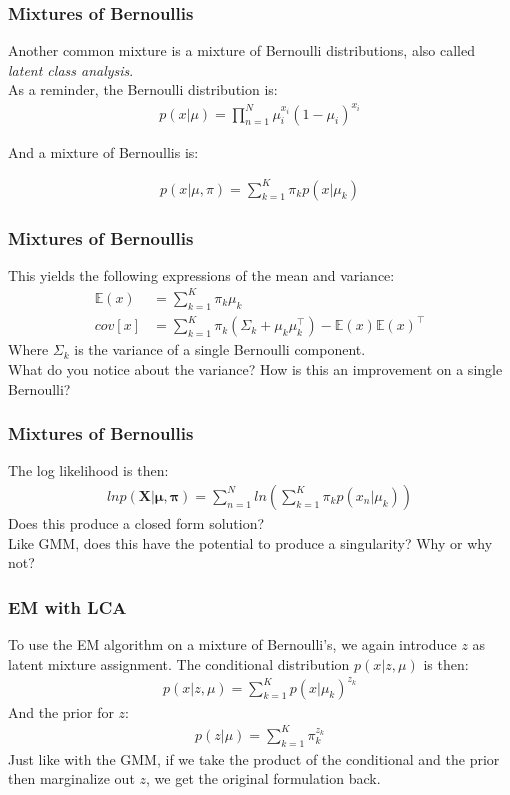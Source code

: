 \documentclass{beamer}
\begin{document}
\begin{frame}
\frametitle{Mixtures of Bernoullis}
	Another common mixture is a mixture of Bernoulli distributions, also called \textit{latent class analysis}.\\
	As a reminder, the Bernoulli distribution is:
	\begin{align*}
	p(x|\mu) = \prod_{n = 1}^{N} \mu_i^{x_i}(1 - \mu_i)^{x_i}
	\end{align*}
	
	And a mixture of Bernoullis is:
	
	\begin{align*}
		p(x|\mu, \pi) = \sum_{k=1}^{K} \pi_k p(x|\mu_k) 
	\end{align*}
\end{frame}


\begin{frame}
\frametitle{Mixtures of Bernoullis}
	This yields the following expressions of the mean and variance:
	\begin{align*}
	\mathbb{E}(x)& = \sum_{k=1}^{K} \pi_k \mu_k \\
	cov[x]  &= \sum_{k=1}^{K}  \pi_k (\Sigma_k + \mu_k \mu_k^{\intercal}) - \mathbb{E}(x)\mathbb{E}(x)^{\intercal}
	\end{align*}
	Where $\Sigma_{k}$ is the variance of a single Bernoulli component.\\
	What do you notice about the variance? How is this an improvement on a single Bernoulli?
\end{frame}

\begin{frame}
\frametitle{Mixtures of Bernoullis}
	The log likelihood is then:
	\begin{align*}
	ln p(\mathbf{X}|\mathbf{\mu}, \mathbf{\pi}) = \sum_{n=1}^{N} ln (\sum_{k =1}^{K} \pi_k p(x_n|\mu_k))
	\end{align*}
	Does this produce a closed form solution?\\
	Like GMM, does this have the potential to produce a singularity? Why or why not?
\end{frame}

\begin{frame}
\frametitle{EM with LCA}
	To use the EM algorithm on a mixture of Bernoulli's, we again introduce $z$ as latent mixture assignment. The conditional distribution $p(x|z, \mu)$ is then:
	\begin{align*}
	p(x|z, \mu) = \sum_{k=1}^{K} p(x|\mu_k)^{z_k}
	\end{align*}
	And the prior for $z$:
	\begin{align*}
	p(z|\mu) = \sum_{k=1}^{K} \pi_k^{z_k}
	\end{align*}
	Just like with the GMM, if we take the product of the conditional and the prior then marginalize out $z$, we get the original formulation back.
\end{frame}
\end{document}
